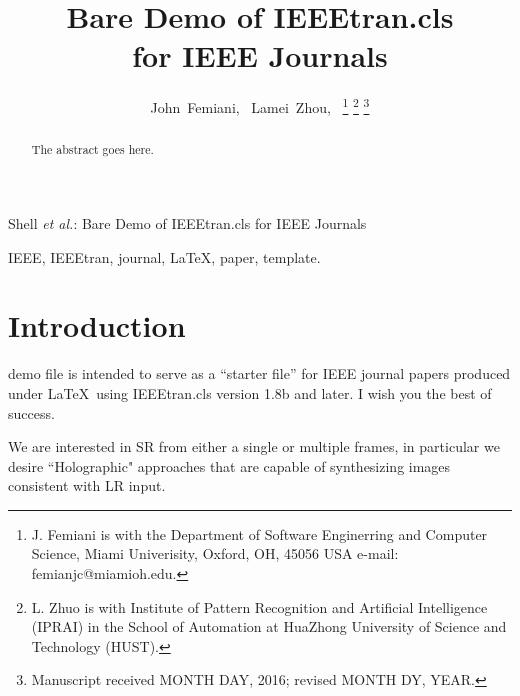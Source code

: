 \documentclass[journal]{IEEEtran}
\begin{document}
\title{Bare Demo of IEEEtran.cls\\ for IEEE Journals}

\author{John~Femiani,~
        Lamei~Zhou,~%
\thanks{J. Femiani is with the Department
of Software Enginerring and Computer Science, Miami Univerisity, Oxford,
OH, 45056 USA e-mail: femianjc@miamioh.edu.}%
\thanks{L. Zhuo is with Institute of Pattern Recognition and Artificial Intelligence (IPRAI) in the  School of Automation at HuaZhong University of Science and Technology (HUST).}%
\thanks{Manuscript received MONTH DAY, 2016; revised MONTH DY, YEAR.}}


%
{Shell \MakeLowercase{\textit{et al.}}: Bare Demo of IEEEtran.cls for IEEE Journals}


\maketitle


\begin{abstract}
The abstract goes here.
\end{abstract}

\begin{IEEEkeywords}
IEEE, IEEEtran, journal, \LaTeX, paper, template.
\end{IEEEkeywords}




\section{Introduction}




 demo file is intended to serve as a ``starter file''
for IEEE journal papers produced under \LaTeX\ using
IEEEtran.cls version 1.8b and later. I wish you the best of success.


We are interested in \ac{SR} from either a single or multiple frames, in particular we desire ``Holographic" approaches that are capable of synthesizing images consistent with \ac{LR} input.  
\end{document}
